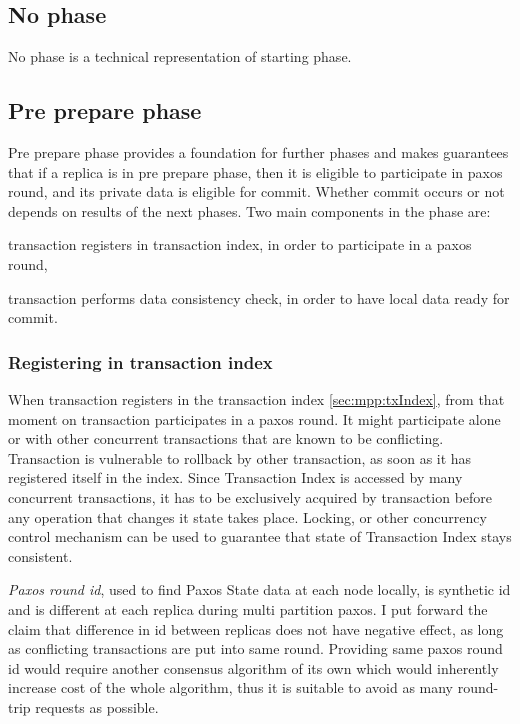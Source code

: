 \subsection{No phase}
No phase is a technical representation of starting phase.

\subsection{Pre prepare phase}
Pre prepare phase provides a foundation for further phases and makes guarantees that if a replica is in pre prepare phase, then it is eligible to participate in paxos round, and its private data is eligible for commit. Whether commit occurs or not depends on results of the next phases. Two main components in the phase are: \begin{enumerate*}
\item transaction registers in transaction index, in order to participate in a paxos round,
\item transaction performs data consistency check, in order to have local data ready for commit.
\end{enumerate*}


\subsubsection{Registering in transaction index}
When transaction registers in the transaction index \ref{sec:mpp:txIndex}, from that moment on transaction participates in a paxos round.
It might participate alone or with other concurrent transactions that are known to be conflicting. 
Transaction is vulnerable to rollback by other transaction, as soon as it has registered itself in the index.
Since Transaction Index is accessed by many concurrent transactions, it has to be exclusively acquired by transaction before any operation that changes it state takes place. 
Locking, or other concurrency control mechanism can be used to guarantee that state of Transaction Index stays consistent.


\emph{Paxos round id}, used to find Paxos State data at each node locally, is synthetic id and is different at each replica during multi partition paxos. 
I put forward the claim that difference in id between replicas does not have negative effect, as long as conflicting transactions are put into same round. 
Providing same paxos round id would require another consensus algorithm of its own which would inherently increase cost of the whole algorithm, thus it is suitable to avoid as many round-trip requests as possible.
        
